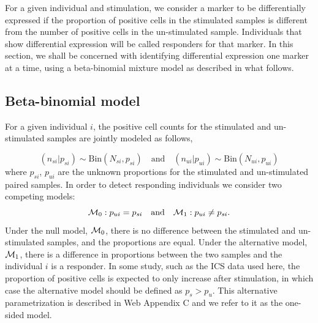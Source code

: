 \documentclass[useAMS,referee,usenatbib]{biom}
\begin{document}
For a given individual and stimulation, we consider a marker to be differentially expressed if the proportion of positive cells in the stimulated samples is different from the number of positive cells in the un-stimulated sample. Individuals that show differential expression will be called responders for that marker. In this section, we shall be concerned with identifying differential expression one marker at a time, using a beta-binomial mixture model as described in what follows. 

\subsection{Beta-binomial model}
\label{s:DE}
For a given individual $i$, the positive cell counts for the stimulated and un-stimulated samples are jointly modeled as follows,

\begin{equation*}
(n_{si}|p_{si}) \sim \mathrm{Bin}(N_{si},p_{si})\quad \text{and}\quad (n_{ui}|p_{ui}) \sim \mathrm{Bin}(N_{ui},p_{ui})\label{eq:bino_likelihood}
\end{equation*}
where $p_{si}$, $p_{ui}$ are the unknown proportions for the stimulated and un-stimulated paired samples. In order to detect responding individuals we consider two competing models:
\begin{equation*}
{\cal M}_0: p_{ui}=p_{si}\quad \text{and}\quad {\cal M}_1: p_{ui}\ne p_{si}. \label{eq:models}
\end{equation*}
Under the null model, ${\cal M}_0$, there is no difference between the stimulated and un-stimulated samples, and the proportions are equal. Under the alternative model, ${\cal M}_1$, there is a difference in proportions between the two samples and the individual $i$ is a responder. In some study, such as the ICS data used here, the proportion of positive cells is expected to only increase after stimulation, in which case the alternative model should be defined as $p_s>p_u$. This alternative parametrization is described in Web Appendix C and we refer to it as the one-sided model.
\end{document}
